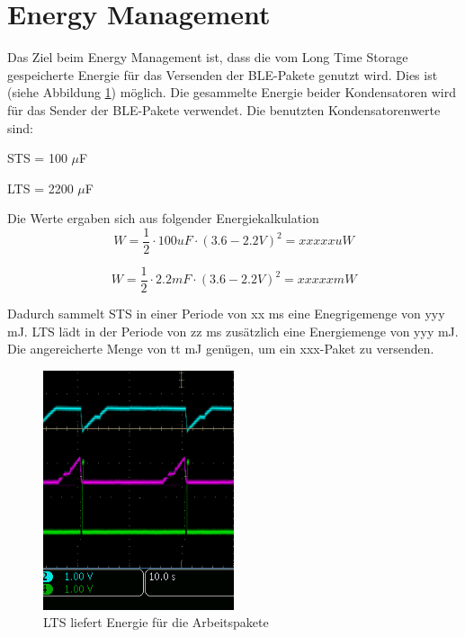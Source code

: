 \section{Energy Management}


Das Ziel beim Energy Management ist, dass die vom Long Time Storage gespeicherte Energie für das Versenden der BLE-Pakete genutzt wird. Dies ist (siehe Abbildung \ref{LTSladet}) möglich. Die gesammelte Energie beider Kondensatoren wird für das Sender der BLE-Pakete verwendet. Die benutzten Kondensatorenwerte sind:

STS = 100 $\mu$F

LTS = 2200 $\mu$F

Die Werte ergaben sich aus folgender Energiekalkulation
\begin{equation}
W=\frac{1}{2}\cdot 100 uF \cdot (3.6 - 2.2 V)^{2}=xxxxx uW\label{eq:Energie STS}
\end{equation}

\begin{equation}
W=\frac{1}{2}\cdot 2.2 mF \cdot (3.6 - 2.2 V)^{2}=xxxxx mW\label{eq:Energie LTS}
\end{equation}


Dadurch sammelt STS in einer Periode von xx ms eine Enegrigemenge von  yyy mJ. LTS lädt in der Periode von  zz ms zusätzlich eine Energiemenge von yyy mJ. Die angereicherte Menge von tt mJ genügen, um ein xxx-Paket zu versenden.


\begin{figure}[ht]
    \includegraphics[width=0.5\textwidth]{4Resultate/imag/FakeLTSEntaden.png} 
    \caption{LTS liefert Energie für die Arbeitspakete}
    \label{LTSladet}
\end{figure}

